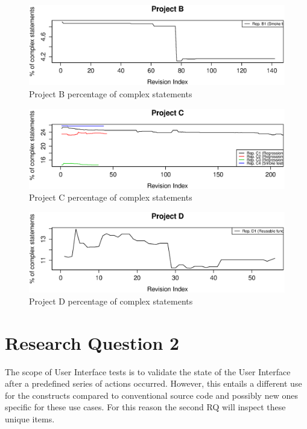 \begin{figure}[!htbp]
    \centering
    \includegraphics[width=\textwidth]{figure/results/rq1/statement_complexity_project_b.eps}
    \caption{Project B percentage of complex statements}
    \label{fig:statement_complexity_project_b}
\end{figure}

\begin{figure}[!htbp]
    \centering
    \includegraphics[width=\textwidth]{figure/results/rq1/statement_complexity_project_c.eps}
    \caption{Project C percentage of complex statements}
    \label{fig:statement_complexity_project_c}
\end{figure}

\begin{figure}[!htbp]
    \centering
    \includegraphics[width=\textwidth]{figure/results/rq1/statement_complexity_project_d.eps}
    \caption{Project D percentage of complex statements}
    \label{fig:statement_complexity_project_d}
\end{figure}



\section{Research Question 2}
%
The scope of User Interface tests is to validate the state of the User Interface after a predefined series of actions occurred. However, this entails a different use for the constructs compared to conventional source code and possibly new ones specific for these use cases. For this reason the second RQ will inspect these unique items.

